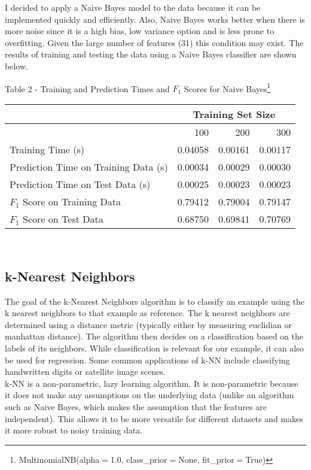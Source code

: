 \documentclass[11pt]{article}
\begin{document}
I decided to apply a Naive Bayes model to the data because it can be implemented quickly and efficiently. Also, Naive Bayes works better when there is more noise since it is a high bias, low variance option and is less prone to overfitting. Given the large number of features (31) this condition may exist. The results of training and testing the data using a Naive Bayes classifier are shown below.\\

\begin{center} Table 2 - Training and Prediction Times and $F_1$ Scores for Naive Bayes\footnote{MultinomialNB(alpha$=$1.0, class\_prior$=$None, fit\_prior$=$True)}
\end{center}
\begin{tabular}{ l r r r }
  & \multicolumn{3}{c}{Training Set Size} \\
  \hline
  & 100 & 200 & 300\\
  \hline
  Training Time (s) & 0.04058 & 0.00161 & 0.00117 \\
  Prediction Time on Training Data (s) & 0.00034 & 0.00029 & 0.00030 \\
  Prediction Time on Test Data (s) & 0.00025 & 0.00023 & 0.00023 \\
  $F_1$ Score on Training Data & 0.79412 & 0.79004 & 0.79147\\
  $F_1$ Score on Test Data & 0.68750 & 0.69841 & 0.70769\\
\end{tabular}
\\

\subsection{k-Nearest Neighbors}
The goal of the k-Nearest Neighbors algorithm is to classify an example using the k nearest neighbors to that example as reference. The k nearest neighbors are determined using a distance metric (typically either by measuring euclidian or manhattan distance). The algorithm then decides on a classification based on the labels of its neighbors. While classification is relevant for our example, it can also be used for regression. Some common applications of k-NN include classifying handwritten digits or satellite image scenes.\\

k-NN is a non-parametric, lazy learning algorithm. It is non-parametric because it does not make any assumptions on the underlying data (unlike an algorithm such as Naive Bayes, which makes the assumption that the features are independent). This allows it to be more versatile for different datasets and makes it more robust to noisy training data.\\
\end{document}
